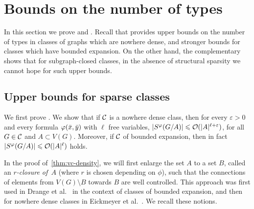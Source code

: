 \section{Bounds on the number of types}\label{sec:types}

In this section we prove  and .
	Recall that  provides upper bounds on the number of types in classes of graphs which are nowhere dense, 
	and stronger bounds for classes which have bounded expansion. 
	On the other hand, the complementary  shows that for subgraph-closed classes, in the absence of structural sparsity we cannot hope for such upper bounds.

\subsection{Upper bounds for sparse classes}
We first prove .
We show  that if $\mathcal{C}$ is a nowhere dense class,
then for every $\varepsilon>0$ 
and every formula $\varphi(\bar{x},\bar{y})$
with $\ell$ free variables,
  $|S^\varphi(G/A)|\leqslant \mathcal{O}(|A|^{\ell+\varepsilon})$,
for all $G\in \mathcal{C}$ and $A\subset V(G)$.
 Moreover, if $\mathcal{C}$  of bounded expansion, then in fact $|S^\varphi(G/A)|\leqslant \mathcal{O}(|A|^\ell)$ holds.

In the proof of~\cref{thm:vc-density},
we will first enlarge the set $A$ to a set $B$, called
an \emph{$r$-closure of~$A$} (where $r$ is chosen depending on $\phi$), such 
that the connections of elements from $V(G)\setminus B$ 
towards $B$ are well controlled. This approach
was first used in Drange et al.~\cite{drange2016kernelization} in the context of classes of bounded expansion, 
and then for nowhere dense classes in Eickmeyer et al.~\cite{eickmeyer2016neighborhood}. 
We recall these notions.

